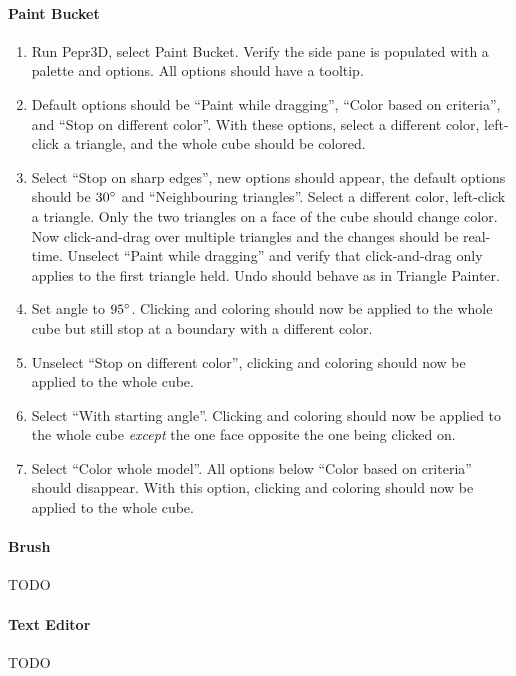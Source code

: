 \paragraph{Paint Bucket}

\begin{enumerate}
\item Run Pepr3D, select Paint Bucket. Verify the side pane is populated with a palette and options. All options should have a tooltip.
\item Default options should be ``Paint while dragging'', ``Color based on criteria'', and ``Stop on different color''. With these options, select a different color, left-click a triangle, and the whole cube should be colored.
\item Select ``Stop on sharp edges'', new options should appear, the default options should be $30\degree$ and ``Neighbouring triangles''. Select a different color, left-click a triangle. Only the two triangles on a face of the cube should change color. Now click-and-drag over multiple triangles and the changes should be real-time. Unselect ``Paint while dragging'' and verify that click-and-drag only applies to the first triangle held. Undo should behave as in Triangle Painter.
\item Set angle to $95\degree$. Clicking and coloring should now be applied to the whole cube but still stop at a boundary with a different color.
\item Unselect ``Stop on different color'', clicking and coloring should now be applied to the whole cube.
\item Select ``With starting angle''. Clicking and coloring should now be applied to the whole cube \emph{except} the one face opposite the one being clicked on.
\item Select ``Color whole model''. All options below ``Color based on criteria'' should disappear. With this option, clicking and coloring should now be applied to the whole cube.
\end{enumerate}

\paragraph{Brush}

TODO

\paragraph{Text Editor}

TODO


